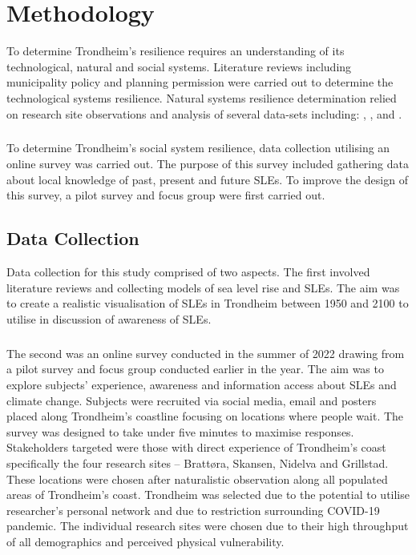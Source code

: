 
\chapter{Methodology}
To determine Trondheim's resilience requires an understanding of its technological, natural and social systems. Literature reviews including municipality policy and planning permission were carried out to determine the technological systems resilience. Natural systems resilience determination relied on research site observations and analysis of several  data-sets including: \cite{geonorge_stormflo_nodate} , \cite{kartverket_se_2021}, \cite{stormflo_database_stormflo_2021} and \cite{ipcc_sea_2021}. 
\paragraph{}
To determine Trondheim's social system resilience, data collection utilising an online survey was carried out. The purpose of this survey included gathering data about local knowledge of past, present and future SLEs. To improve the design of this survey, a pilot survey and focus group were first carried out.  



\section{Data Collection}

Data collection for this study comprised of two aspects.  The first involved literature reviews and collecting models of sea level rise and SLEs. The aim was to create a realistic visualisation of SLEs in Trondheim between 1950 and 2100 to utilise in discussion of awareness of SLEs. 
\paragraph{}

The second was an online survey conducted in the summer of 2022 drawing from a pilot survey and focus group conducted earlier in the year. The aim was to explore subjects' experience, awareness and information access about SLEs and climate change. Subjects were recruited via social media, email and posters placed along Trondheim’s coastline focusing on locations where people wait. The survey was designed to take under five minutes to maximise responses. Stakeholders targeted were those with direct experience of Trondheim’s coast specifically the four research sites – Brattøra, Skansen, Nidelva and Grillstad. These locations were chosen after naturalistic observation along all populated areas of Trondheim’s coast. Trondheim was selected due to the potential to utilise researcher's personal network and due to restriction surrounding COVID-19 pandemic. The individual research sites were chosen due to their high throughput of all demographics and perceived physical vulnerability.
